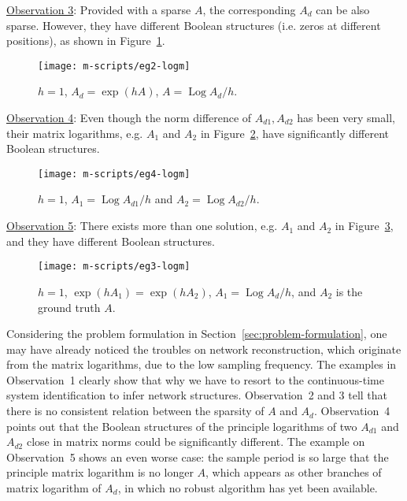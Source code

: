 \documentclass[letterpaper,10pt,journal,final]{IEEEtran}
\theoremstyle{definition}
\theoremstyle{remark}
\newcommand{\Log}{\operatorname{Log}}
\begin{document}
\smallskip
\noindent\underline{Observation 3}: Provided with a sparse $A$, the corresponding $A_d$
can be also sparse. However, they have different Boolean structures (i.e. zeros at
different positions), as shown in Figure~\ref{fig:logm-eg-2}.
\begin{figure}[htb]
  \centering
    \texttt{[image: m-scripts/eg2-logm]}
    \caption{$h = 1$, $A_d = \exp{(hA)}$, $A = \Log{A_d}/h$. }
    \label{fig:logm-eg-2}
\end{figure}

\smallskip
\noindent\underline{Observation 4}: Even though the norm difference of $A_{d1}, A_{d2}$ has been
very small, their matrix logarithms, e.g. $A_1$ and $A_2$ in
Figure~\ref{fig:logm-eg-4}, have significantly different Boolean structures.
\begin{figure}[htb]
  \centering
    \texttt{[image: m-scripts/eg4-logm]}
    \caption{$h = 1$, $A_1 = \Log{A_{d1}}/h$ and $A_2 = \Log{A_{d2}}/h$.}
    \label{fig:logm-eg-4}
\end{figure}

\smallskip
\noindent\underline{Observation 5}: There exists more than one solution, e.g. $A_1$ and
$A_2$ in Figure~\ref{fig:logm-eg-3}, and they have different Boolean structures.
\begin{figure}[htb]
  \centering
    \texttt{[image: m-scripts/eg3-logm]}
    \caption{$h = 1$, $\exp{(hA_1)} = \exp{(hA_2)}$, $A_1 = \Log{A_d}/h$, and
      $A_2$ is the ground truth $A$. }
    \label{fig:logm-eg-3}
\end{figure}

Considering the problem formulation in Section~\ref{sec:problem-formulation}, one may
have already noticed the troubles on network reconstruction, which originate from the
matrix logarithms, due to the low sampling frequency.  The examples in
{Observation~1} clearly show that why we have to resort to the continuous-time
system identification to infer network structures. {Observation~2} and
{3} tell that there is no consistent relation between the sparsity of $A$ and
$A_d$.  {Observation~4} points out that the Boolean structures of the
principle logarithms of two $A_{d1}$ and $A_{d2}$ close in matrix norms could be
significantly different.  The example on {Observation~5} shows an even worse
case: the sample period is so large that the principle matrix logarithm is no longer
$A$, which appears as other branches of matrix logarithm of $A_d$, in which no robust
algorithm has yet been available.
\end{document}
